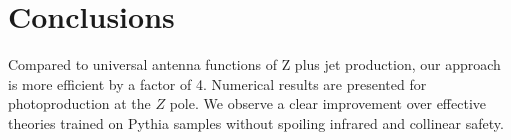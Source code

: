 \section{Conclusions}\label{sec:conclusions}

Compared to universal antenna functions of Z plus jet production, our
approach is more efficient by a factor of 4. Numerical results are
presented for photoproduction at the $Z$ pole. We observe a clear
improvement over effective theories trained on Pythia samples without
spoiling infrared and collinear safety.

